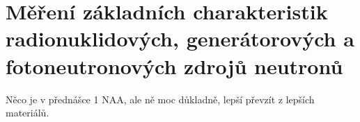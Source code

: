 \section[Neutronové zdroje]{Měření základních charakteristik radionuklidových, generátorových a fotoneutronových zdrojů neutronů}

Něco je v přednášce 1 NAA, ale ně moc důkladně, lepší převzít z lepších materiálů.